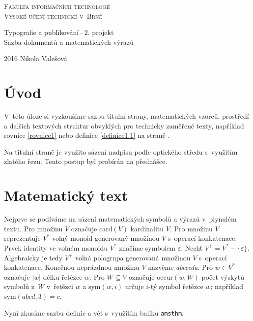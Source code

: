 \documentclass[a4paper,11pt,twocolumn]{article}
\theoremstyle{definition}
\theoremstyle{definition}
\theoremstyle{definition}
\begin{document}
\begin{titlepage}
	\centering
	{\textsc{\Huge Fakulta informačních technologií\\
	Vysoké učení technické v~Brně}}


	{\LARGE Typografie a publikování\,--\,2. projekt\\
	Sazba dokumentů a matematických výrazů}


	{\Large 2016 \hfill Nikola Valešová }
\end{titlepage}

\setcounter{secnumdepth}{0}
\section{Úvod}
V~této úloze si vyzkoušíme sazbu titulní strany, matematických vzorců, prostředí a dalších textových struktur obvyklých pro technicky zaměřené texty, například rovnice \eqref{rovnice1} nebo definice \ref{definice1.1} na straně \pageref{definice1.1}.

Na titulní straně je využito sázení nadpisu podle optického středu s~využitím zlatého řezu. Tento postup byl probírán na přednášce.

\setcounter{secnumdepth}{1}
\section{Matematický text}
Nejprve se podíváme na sázení matematických symbolů a výrazů v~plynulém textu. Pro množinu $V$ označuje $\mbox{card}(V)$ kardinalitu $V$.
Pro množinu $V$ reprezentuje $V^*$ volný monoid generovaný množinou $V$ s~operací konkatenace.
Prvek identity ve volném monoidu $V^*$ značíme symbolem $\varepsilon$.
Nechť $V^+ = V^* - \{\varepsilon\}$. Algebraicky je tedy $V^+$ volná pologrupa generovaná množinou $V$ s~operací konkatenace.
Konečnou neprázdnou množinu $V$ nazvěme \emph{abeceda}.
Pro $w \in V^*$ označuje $|w|$ délku řetězce $w$. Pro $W \subseteq V$ označuje $\mbox{occur}(w,W)$ počet výskytů symbolů z~$W$ v~řetězci $w$ a $\mbox{sym}(w,i)$ určuje $i$-tý symbol řetězce $w$; například $\mbox{sym}(abcd,3)=c$.

Nyní zkusíme sazbu definic a vět s~využitím balíku \texttt{amsthm}.
\end{document}
